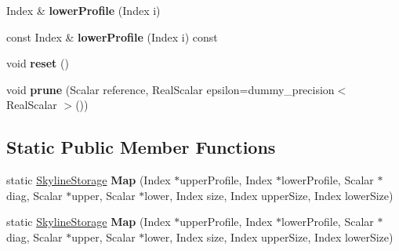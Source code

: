 \begin{DoxyCompactItemize}
\mbox{\label{class_eigen_1_1_skyline_storage_a1e9e0fc36cf307cebf3ef4d50bd2d0a5}} 
Index \& {\bfseries lower\+Profile} (Index i)
\item 
\mbox{\label{class_eigen_1_1_skyline_storage_a35c879bb44a9a88706bbff6323b7c61b}} 
const Index \& {\bfseries lower\+Profile} (Index i) const
\item 
\mbox{\label{class_eigen_1_1_skyline_storage_a2cec483a57f255f956f6a42d6bac6b57}} 
void {\bfseries reset} ()
\item 
\mbox{\label{class_eigen_1_1_skyline_storage_a9b7d56e2715fe6db7a10b9f151a98bbe}} 
void {\bfseries prune} (Scalar reference, Real\+Scalar epsilon=dummy\+\_\+precision$<$ Real\+Scalar $>$())
\end{DoxyCompactItemize}
\subsection*{Static Public Member Functions}
\begin{DoxyCompactItemize}
\item 
\mbox{\label{class_eigen_1_1_skyline_storage_a8b75a16ed77d3f0b4027899b69aceffe}} 
static \hyperlink{class_eigen_1_1_skyline_storage}{Skyline\+Storage} {\bfseries Map} (Index $\ast$upper\+Profile, Index $\ast$lower\+Profile, Scalar $\ast$diag, Scalar $\ast$upper, Scalar $\ast$lower, Index size, Index upper\+Size, Index lower\+Size)
\item 
\mbox{\label{class_eigen_1_1_skyline_storage_a8b75a16ed77d3f0b4027899b69aceffe}} 
static \hyperlink{class_eigen_1_1_skyline_storage}{Skyline\+Storage} {\bfseries Map} (Index $\ast$upper\+Profile, Index $\ast$lower\+Profile, Scalar $\ast$diag, Scalar $\ast$upper, Scalar $\ast$lower, Index size, Index upper\+Size, Index lower\+Size)
\end{DoxyCompactItemize}
